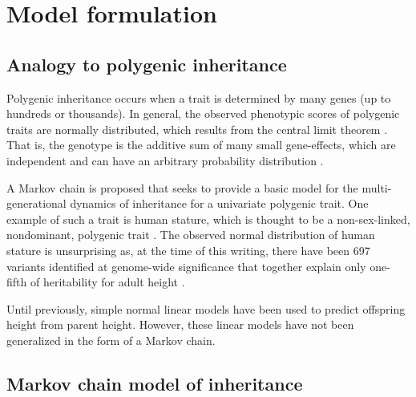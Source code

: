 \documentclass[letterpaper,10pt]{article} %
\begin{document}
\newpage

\tableofcontents
\clearpage





\section{Model formulation}

\subsection{Analogy to polygenic inheritance}
Polygenic inheritance occurs when a trait is determined by many genes (up to hundreds or thousands). In general, the observed phenotypic scores of polygenic traits are normally distributed, which results from the central limit theorem \cite{rieger}. That is, the genotype is the additive sum of many small gene-effects, which are independent and can have an arbitrary probability distribution \cite{lange_book}. 

A Markov chain is proposed that seeks to provide a basic model for the multi-generational dynamics of inheritance for a univariate polygenic trait. One example of such a trait is human stature, which is thought to be a non-sex-linked, nondominant, polygenic trait \cite{luo}. The observed normal distribution of human stature is unsurprising as, at the time of this writing, there have been 697 variants identified at genome-wide significance that together explain only one-fifth of heritability for adult height \cite{preece, wood}. 

Until previously, simple normal linear models have been used to predict offspring height from parent height. However, these linear models have not been generalized in the form of a Markov chain. 

\subsection{Markov chain model of inheritance}
\end{document}

